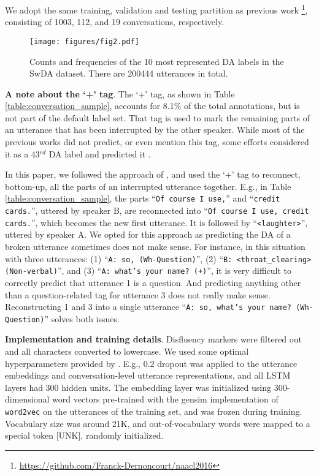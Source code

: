 \documentclass[11pt,a4paper]{article}
\begin{document}
We adopt the same training, validation and testing partition as previous work \citep{lee2016sequential}\footnote{\url{https://github.com/Franck-Dernoncourt/naacl2016}}, consisting of 1003, 112, and 19 conversations, respectively.

\begin{figure}[t]
\centering
\texttt{[image: figures/fig2.pdf]}
\caption{Counts and frequencies of the 10 most represented DA labels in the SwDA dataset.
There are 200444 utterances in total.}
\label{fig:barplot}
\end{figure}


\noindent \textbf{A note about the `+' tag}.
The `+' tag, as shown in Table \ref{table:conversation_sample}, accounts for 8.1\% of the total annotations, but is not part of the default label set.
That tag is used to mark the remaining parts of an utterance that has been interrupted by the other speaker.
While most of the previous works did not predict, or even mention this tag, some efforts considered it as a 43$^{rd}$ DA label and predicted it \citep{lee2016sequential,raheja-tetreault-2019-dialogue}.

In this paper, we followed the approach of \citep{webb2005dialogue,milajevs-purver-2014-investigating,kim2017compositional}, and used the `+' tag to reconnect, bottom-up, all the parts of an interrupted utterance together.
E.g., in Table \ref{table:conversation_sample}, the parts ``{\small \texttt{Of course I use,}}'' and ``{\small \texttt{credit cards.}}'', uttered by speaker B, are reconnected into ``{\small \texttt{Of course I use, credit cards.}}'', which becomes the new first utterance.
It is followed by ``{\small \texttt{<laughter>}}'', uttered by speaker A.
We opted for this approach as predicting the DA of a broken utterance sometimes does not make sense.
For instance, in this situation with three utterances: (1) ``{\small \texttt{A: so, (Wh-Question)}}'', (2) ``{\small \texttt{B: <throat\_clearing> (Non-verbal)}}'', and (3) ``{\small \texttt{A: what's your name? (+)}}'', it is very difficult to correctly predict that utterance 1 is a question.
And predicting anything other than a question-related tag for utterance 3 does not really make sense.
Reconstructing 1 and 3 into a single utterance ``{\small \texttt{A: so, what's your name? (Wh-Question)}}'' solves both issues.

\noindent\textbf{Implementation and training details}.
Disfluency markers \citep{meteer1995dysfluency} were filtered out and all characters converted to lowercase.
We used some optimal hyperparameters provided by \citet{kumar2018dialogue}.
E.g., 0.2 dropout was applied to the utterance embeddings and conversation-level utterance representations, and all LSTM layers had 300 hidden units.
The embedding layer was initialized using 300-dimensional word vectors pre-trained with the gensim \cite{rehurek_lrec} implementation of {\small\texttt{word2vec}} \citep{mikolov2013efficient} on the utterances of the training set, and was frozen during training.
Vocabulary size was around 21K, and out-of-vocabulary words were mapped to a special token [UNK], randomly initialized. 
\end{document}
